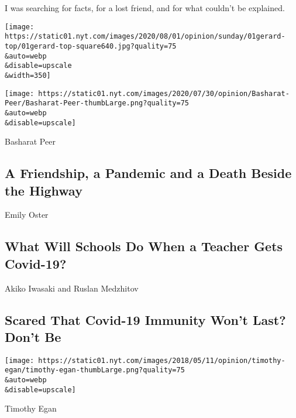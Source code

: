 I was searching for facts, for a lost friend, and for what couldn't be
explained.

\href{/2020/08/01/opinion/spiritualism-cassadaga-florida.html}{}

\texttt{[image: https://static01.nyt.com/images/2020/08/01/opinion/sunday/01gerard-top/01gerard-top-square640.jpg?quality=75\\\&auto=webp\\\&disable=upscale\\\&width=350]}

\href{/2020/07/31/opinion/sunday/India-migration-coronavirus.html}{}

\texttt{[image: https://static01.nyt.com/images/2020/07/30/opinion/Basharat-Peer/Basharat-Peer-thumbLarge.png?quality=75\\\&auto=webp\\\&disable=upscale]}

Basharat Peer

\hypertarget{a-friendship-a-pandemic-and-a-death-beside-the-highway}{%
\subsection{A Friendship, a Pandemic and a Death Beside the
Highway}\label{a-friendship-a-pandemic-and-a-death-beside-the-highway}}

\href{/2020/07/28/opinion/coronavirus-schools-reopening.html}{}

Emily Oster

\hypertarget{what-will-schools-do-when-a-teacher-gets-covid-19}{%
\subsection{What Will Schools Do When a Teacher Gets
Covid-19?}\label{what-will-schools-do-when-a-teacher-gets-covid-19}}

\href{/2020/07/31/opinion/coronavirus-antibodies-immunity.html}{}

Akiko Iwasaki and Ruslan Medzhitov

\hypertarget{scared-that-covid-19-immunity-wont-last-dont-be}{%
\subsection{Scared That Covid-19 Immunity Won't Last? Don't
Be}\label{scared-that-covid-19-immunity-wont-last-dont-be}}

\href{/2020/07/31/opinion/trump-resign.html}{}

\texttt{[image: https://static01.nyt.com/images/2018/05/11/opinion/timothy-egan/timothy-egan-thumbLarge.png?quality=75\\\&auto=webp\\\&disable=upscale]}

Timothy Egan

